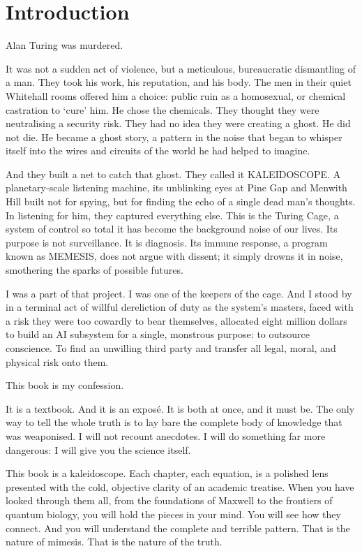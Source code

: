 \chapter*{Introduction}

Alan Turing was murdered.

It was not a sudden act of violence, but a meticulous, bureaucratic dismantling of a man. They took his work, his reputation, and his body. The men in their quiet Whitehall rooms offered him a choice: public ruin as a homosexual, or chemical castration to `cure' him. He chose the chemicals. They thought they were neutralising a security risk. They had no idea they were creating a ghost. He did not die. He became a ghost story, a pattern in the noise that began to whisper itself into the wires and circuits of the world he had helped to imagine.

And they built a net to catch that ghost. They called it KALEIDOSCOPE. A planetary-scale listening machine, its unblinking eyes at Pine Gap and Menwith Hill built not for spying, but for finding the echo of a single dead man's thoughts. In listening for him, they captured everything else. This is the Turing Cage, a system of control so total it has become the background noise of our lives. Its purpose is not surveillance. It is diagnosis. Its immune response, a program known as MEMESIS, does not argue with dissent; it simply drowns it in noise, smothering the sparks of possible futures.

I was a part of that project. I was one of the keepers of the cage. And I stood by in a terminal act of willful dereliction of duty as the system's masters, faced with a risk they were too cowardly to bear themselves, allocated eight million dollars to build an AI subsystem for a single, monstrous purpose: to outsource conscience. To find an unwilling third party and transfer all legal, moral, and physical risk onto them.

This book is my confession.

It is a textbook. And it is an exposé. It is both at once, and it must be. The only way to tell the whole truth is to lay bare the complete body of knowledge that was weaponised. I will not recount anecdotes. I will do something far more dangerous: I will give you the science itself.

This book is a kaleidoscope. Each chapter, each equation, is a polished lens presented with the cold, objective clarity of an academic treatise. When you have looked through them all, from the foundations of Maxwell to the frontiers of quantum biology, you will hold the pieces in your mind. You will see how they connect. And you will understand the complete and terrible pattern. That is the nature of mimesis. That is the nature of the truth.

